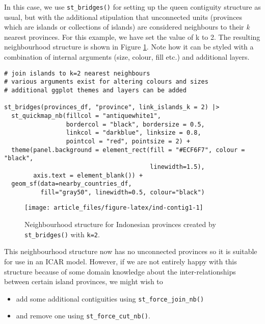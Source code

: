 In this case, we use \texttt{st\_bridges()} for setting up the queen contiguity
structure as usual, but with the additional stipulation that unconnected
units (provinces which are islands or collections of islands) are
considered neighbours to their \emph{k} nearest provinces. For this example,
we have set the value of k to 2. The resulting neighbourhood structure
is shown in Figure \ref{fig:ind-contig1}. Note how it can be styled with a combination of internal arguments (size, colour, fill etc.) and additional  layers.



\begin{verbatim}
# join islands to k=2 nearest neighbours
# various arguments exist for altering colours and sizes
# additional ggplot themes and layers can be added

st_bridges(provinces_df, "province", link_islands_k = 2) |>
  st_quickmap_nb(fillcol = "antiquewhite1",
                 bordercol = "black", bordersize = 0.5,
                 linkcol = "darkblue", linksize = 0.8,
                 pointcol = "red", pointsize = 2) +
  theme(panel.background = element_rect(fill = "#ECF6F7", colour = "black",
                                        linewidth=1.5),
        axis.text = element_blank()) +
  geom_sf(data=nearby_countries_df,
          fill="gray50", linewidth=0.5, colour="black")
\end{verbatim}

\begin{figure}

{\centering \texttt{[image: article\_files/figure-latex/ind-contig1-1]} 

}

\caption{Neighbourhood structure for Indonesian provinces created by \texttt{st\_bridges()} with \texttt{k=2}.}\label{fig:ind-contig1}
\end{figure}

This neighbourhood structure now has no unconnected provinces so it is
suitable for use in an ICAR model. However, if we are not entirely happy with this structure because of some domain knowledge about the inter-relationships between certain island provinces, we might wish to

\begin{itemize}
\item
  add some additional contiguities using \texttt{st\_force\_join\_nb()}
\item
  and remove one using \texttt{st\_force\_cut\_nb()}.
\end{itemize}

